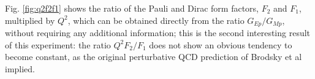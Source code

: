 Fig. \ref{fig:q2f2f1} shows the ratio of the 
Pauli and Dirac form factors, $F_2$ and $F_1$, multiplied by $Q^2$, which can be  obtained directly
from the ratio $G_{Ep}/G_{Mp}$, without requiring any additional information; this is the 
second interesting result of this experiment: the ratio $Q^2{F_2/F_1}$ does not show an obvious tendency 
to become constant, as the original perturbative QCD prediction of Brodsky 
et al~\cite{brodsky} implied.  




